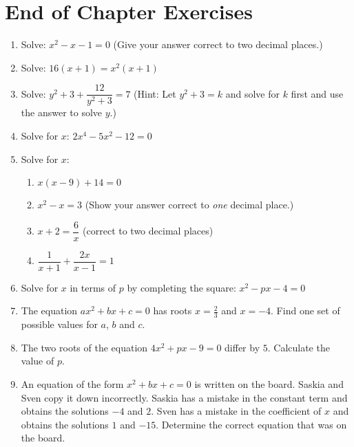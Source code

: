 \section{End of Chapter Exercises}
\begin{enumerate}
\item{Solve: $x^2 - x - 1 = 0$ \quad (Give your answer correct to two decimal places.)}
\item{Solve: $16(x+1) = x^2 (x+1)$}
\item{Solve: $y^2 + 3 + \dfrac{12}{y^2 + 3} = 7$ \quad
(Hint:  Let $y^2+3 = k$ and solve for $k$ first and use the answer to solve $y$.)}
\item{Solve for $x$: $2x^4 - 5x^2 - 12 = 0$}
\item{Solve for $x$:
\begin{enumerate}
\item{$x(x-9)+14 = 0$}
\item{$x^2  - x = 3$ \quad (Show your answer correct to \textit{one} decimal place.)}
\item{$x + 2 = \dfrac{6}{x}$ \quad (correct to two decimal places)}
\item{$\dfrac{1}{x+1}+\dfrac{2x}{x-1} = 1$}
\end{enumerate}}
\item{Solve for $x$ in terms of $p$ by completing the square: $x^2 - px - 4 = 0$}
\item{The equation $ax^2 + bx + c = 0$ has roots $x=\tfrac{2}{3}$ and $x=-4$. Find one set of possible values for $a$, $b$ and $c$.}

\item{The two roots of the equation $4x^2 + px - 9 = 0$ differ by $5$. Calculate the value of $p$.}

\item{ An equation of the form $x^2 + bx + c = 0$ is written
on the board. Saskia and Sven copy it down incorrectly. Saskia has
a mistake in the constant term and obtains the solutions $-4$ and $2$.
Sven has a mistake in the coefficient of $x$ and obtains the solutions
$1$ and $-15$. Determine the correct equation that was on the
board.}


\end{enumerate}

